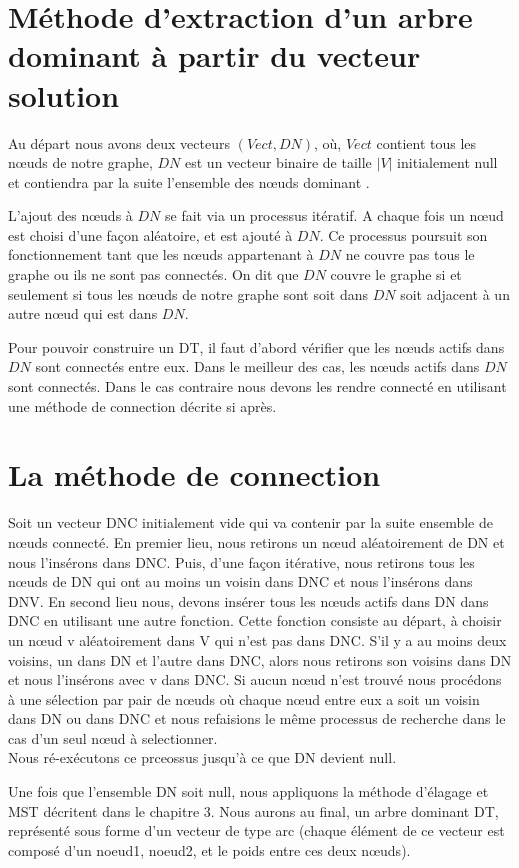 \section{Méthode d'extraction d'un arbre dominant à partir du vecteur solution}
Au départ nous avons deux vecteurs $(Vect, DN)$, où, $Vect$ contient tous les nœuds de notre graphe, $DN$ est un vecteur binaire de taille $|V|$ initialement null et contiendra par la suite l’ensemble des nœuds dominant .

L’ajout des nœuds à $DN$ se fait via un processus itératif. A chaque fois un nœud est choisi d’une façon aléatoire,  et est ajouté à $DN$. Ce processus poursuit son fonctionnement tant que les nœuds appartenant à $DN$ ne couvre pas tous le graphe ou ils ne sont pas  connectés. On dit que $DN$ couvre le graphe si et seulement si tous les nœuds de notre graphe sont soit dans $DN$ soit adjacent à un autre nœud qui est dans $DN$.

Pour pouvoir construire un DT, il faut d’abord vérifier  que les nœuds actifs dans $DN$  sont connectés entre eux. Dans le meilleur des cas, les nœuds actifs dans $DN$ sont connectés. Dans le cas contraire nous devons les rendre connecté en utilisant une méthode de connection décrite si après.

\section{La méthode de connection}
Soit un vecteur DNC initialement vide qui va contenir par la suite ensemble de nœuds connecté. En premier lieu, nous retirons un nœud aléatoirement de DN et nous l’insérons dans DNC. Puis, d’une façon itérative, nous retirons tous les nœuds de DN qui ont au moins un voisin dans DNC et nous l’insérons dans DNV. En second lieu nous, devons insérer tous les nœuds actifs dans DN dans DNC en utilisant une autre fonction. Cette fonction consiste au départ, à choisir un nœud v aléatoirement dans V qui n’est pas dans DNC. S'il y a au moins deux voisins, un dans DN et l’autre dans DNC, alors nous retirons son voisins dans DN et nous l’insérons  avec v dans DNC. Si aucun nœud n’est trouvé nous procédons à une sélection par pair de nœuds où chaque nœud entre eux a soit un voisin dans DN ou dans DNC et nous refaisions le même processus de recherche dans le cas d’un seul nœud à selectionner.\\
Nous ré-exécutons ce prceossus jusqu'à ce que DN devient null.

Une fois que l’ensemble DN soit null, nous appliquons la méthode d’élagage et MST décritent dans le chapitre 3. Nous aurons au final, un arbre dominant DT, représenté sous forme d’un vecteur de type arc (chaque élément de ce vecteur est composé d’un noeud1, noeud2, et le poids entre ces deux nœuds).



